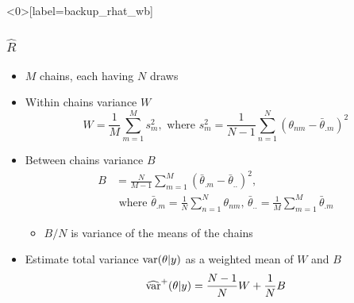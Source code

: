 \documentclass[10pt]{beamer}
\begin{document}
\begin{frame}<0>[label=backup_rhat_wb]

\frametitle{ $\widehat{R}$}

  \begin{itemize}
  \item $M$ chains, each having $N$ draws
  \item<2-> Within chains variance $W$
    \begin{equation*}
      W=\frac{1}{M}\sum_{m=1}^M s^2_m ,\text{ where }
      s^2_m=\frac{1}{N-1}\sum_{n=1}^N (\theta_{nm}-\bar{\theta}_{.m})^2
    \end{equation*}
  \item<3-> Between chains variance $B$
    \begin{align*}
      B&=\frac{N}{M-1}\sum_{m=1}^M
      (\bar{\theta}_{.m}-\bar{\theta}_{..})^2,\\
      &\text{ where } \bar{\theta}_{.m}=\frac{1}{N}\sum_{n=1}^N \theta_{nm}, \,
      \bar{\theta}_{..}=\frac{1}{M}\sum_{m=1}^M\bar{\theta}_{.m}
    \end{align*}
    \begin{itemize}
      \item<4-> $B/N$ is variance of the means of the chains
    \end{itemize}
    \vspace{2mm}
  \item<5-> Estimate total variance
    $\mathrm{var}(\theta|y)$ as a weighted mean of $W$ and $B$
    \begin{equation*}
      \widehat{\mathrm{var}}^{+}(\theta|y) = \frac{N-1}{N}W+\frac{1}{N}B
    \end{equation*}
  \end{itemize}

\end{frame}
\end{document}
